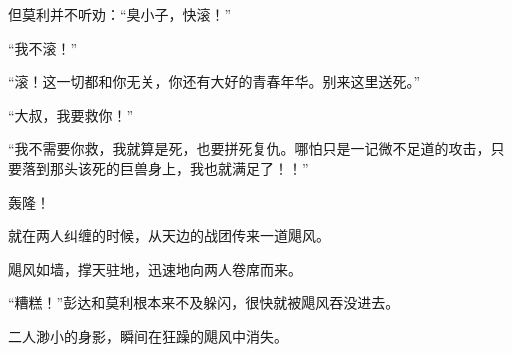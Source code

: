 \begin{this_body}
但莫利并不听劝：“臭小子，快滚！”

“我不滚！”

“滚！这一切都和你无关，你还有大好的青春年华。别来这里送死。”

“大叔，我要救你！”

“我不需要你救，我就算是死，也要拼死复仇。哪怕只是一记微不足道的攻击，只要落到那头该死的巨兽身上，我也就满足了！！”

轰隆！

就在两人纠缠的时候，从天边的战团传来一道飓风。

飓风如墙，撑天驻地，迅速地向两人卷席而来。

“糟糕！”彭达和莫利根本来不及躲闪，很快就被飓风吞没进去。

二人渺小的身影，瞬间在狂躁的飓风中消失。

\end{this_body}

